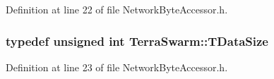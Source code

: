 Definition at line 22 of file Network\-Byte\-Accessor.\-h.

\hypertarget{namespace_terra_swarm_a092e6ec9739175076ae3106783f5c1b6}{
\subsubsection[{T\-Data\-Size}]{\setlength{\rightskip}{0pt plus 5cm}typedef unsigned int {\bf Terra\-Swarm\-::\-T\-Data\-Size}}}\label{namespace_terra_swarm_a092e6ec9739175076ae3106783f5c1b6}


Definition at line 23 of file Network\-Byte\-Accessor.\-h.


